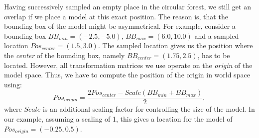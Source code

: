 Having successively sampled an empty place in the circular forest, we still get an overlap if we place a model at this exact position.
The reason is, that the bounding box of the model might be asymmetrical.
For example, consider a bounding box $BB_{min}=(-2.5, -5.0)$, $BB_{max}=(6.0, 10.0)$ and a sampled location $Pos_{center}=(1.5, 3.0)$.
The sampled location gives us the position where the \textit{center} of the bounding box, namely $BB_{center}=(1.75, 2.5)$, has to be located.
However, all transformation matrices we use operate on the \textit{origin} of the model space.
Thus, we have to compute the position of the origin in world space using:
\begin{equation*}
    Pos_{origin}=\frac{2Pos_{center}-Scale(BB_{min}+BB_{max})}{2},
\end{equation*}
where $Scale$ is an additional scaling factor for controlling the size of the model.
In our example, assuming a scaling of 1, this gives a location for the model of $Pos_{origin}=(-0.25, 0.5)$.

